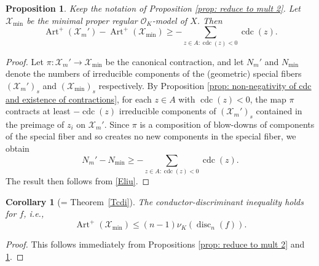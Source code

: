 \documentclass[12pt]{amsart}
\numberwithin{equation}{section}
\newtheorem{corollary}[equation]{Corollary}
\newtheorem{prop}[equation]{Proposition}
\theoremstyle{definition}
\newcommand{\padma}[1]{{\color{Magenta} \sf $\clubsuit\clubsuit\clubsuit$ Padma: [#1]}}
\newcommand{\connor}[1]{{\color{Orange} \sf $\diamondsuit\diamondsuit\diamondsuit$ Connor: [#1]}}
\renewcommand{\O}{\mathcal{O}}
\newcommand{\Spec}{\mathrm{Spec} \ }
\newcommand{\X}{\mathcal{X}}
\newcommand{\Y}{\mathcal{Y}}
\DeclareMathOperator{\disc}{disc}
\DeclareMathOperator{\Art}{Art}
\DeclareMathOperator{\cdc}{cdc}
\begin{document}

\begin{prop}\label{prop: difference in Artin conductors}
Keep the notation of Proposition \ref{prop: reduce to mult 2}. Let $\X_{\min}$ be the minimal proper regular $\O_K$-model of $X$. Then
\[\Art^+(\X_m')-\Art^+(\X_{\min})\geq
  -\sum_{z\in A:\cdc(z)<0}\cdc(z).\] 
\end{prop}
\begin{proof}
    Let $\pi:\X_m'\to\X_{\min}$ be the canonical contraction, and let $N_m'$ and $N_{\min}$ denote the numbers of irreducible components of the (geometric) special fibers $(\X_m')_s$ and $(\X_{\min})_s$ respectively. By Proposition \ref{prop: non-negativity of cdc and existence of contractions}, for each $z\in A$ with $\cdc(z)<0$, the map $\pi$ contracts at least $-\cdc(z)$ irreducible components of $(\X_m')_s$ contained in the preimage of $z_i$ on $\X_m'$. Since $\pi$ is a composition of blow-downs of components of the special fiber and so creates no new components in the special fiber, we obtain 
    \[N_m'-N_{\min}\geq -\sum_{z\in A:\cdc(z)<0}\cdc(z).\]
    The result then follows from \eqref{Eliu}. 
\end{proof}
    
\begin{corollary}[= Theorem~\ref{Tcdi}]\label{cor: conductor-discriminant inequality}
    The conductor-discriminant inequality holds for $f$, i.e.,
    \[\Art^+(\X_{\min})\leq (n-1)\nu_K(\disc_n(f)).\]
\end{corollary}
\begin{proof}
    This follows immediately from Propositions \ref{prop: reduce to mult 2} and \ref{prop: difference in Artin conductors}.
\end{proof}
\end{document}
